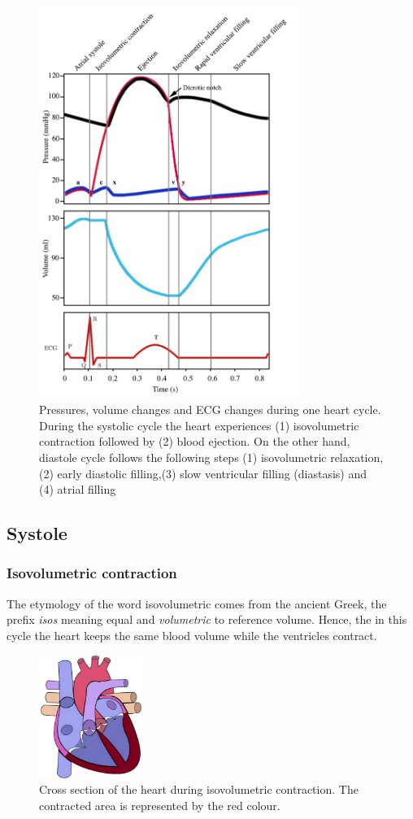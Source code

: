 \begin{figure}[!htpb]
	\centering
	\includegraphics[width=8.5cm,keepaspectratio]{figure_pressure}    
	\caption[Changes of Pressure and Volume in the heart - ECG]{Pressures, volume changes and ECG changes during one heart cycle. During the systolic cycle the heart experiences (1) isovolumetric contraction followed by (2) blood ejection. On the other hand, diastole cycle follows the following steps (1) isovolumetric relaxation, (2) early diastolic filling,(3) slow ventricular filling (diastasis) and (4) atrial filling \cite{fukuta2008cardiac}}
	\label{fig:heart cycle}
\end{figure}

\subsection{Systole}
\subsubsection{Isovolumetric contraction}
The etymology of the word isovolumetric comes from the ancient Greek, the prefix \textit{isos} meaning equal and \textit{volumetric} to reference volume. Hence, the in this cycle the heart keeps the same blood volume while the ventricles contract.

\begin{figure}[!htpb]
		\centering
		\includegraphics[height=4cm,keepaspectratio]{figure_3}   
		\caption[Heart during isovolumetric contaction]{Cross section of the heart during isovolumetric contraction. The contracted area is represented by the red colour.}
		\label{fig:heart isovolumic}
\end{figure}


